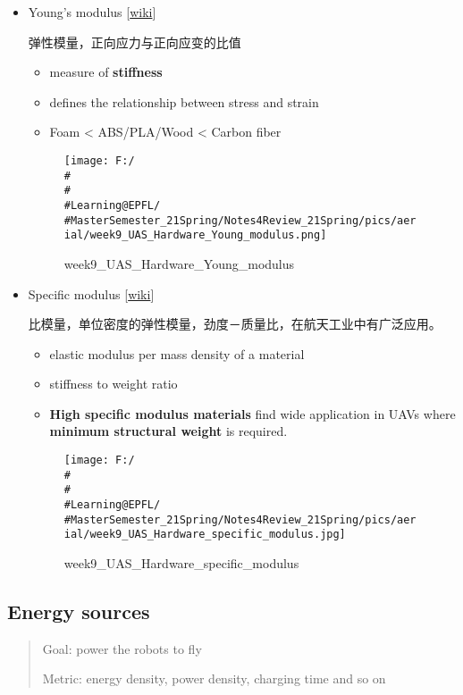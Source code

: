 \documentclass[]{article}
\begin{document}
\begin{itemize}
\item
  Young's modulus
  {[}\href{https://en.wikipedia.org/wiki/Young\%27s_modulus}{wiki}{]}

  弹性模量，正向应力与正向应变的比值

  \begin{itemize}
  \item
    measure of \textbf{stiffness}
  \item
    defines the relationship between stress and strain
  \item
    Foam \textless{} ABS/PLA/Wood \textless{} Carbon fiber
  \end{itemize}

  \begin{figure}
  \centering
  \texttt{[image: F:/\\\#\\\#\\\#Learning@EPFL/\\\#MasterSemester\_21Spring/Notes4Review\_21Spring/pics/aerial/week9\_UAS\_Hardware\_Young\_modulus.png]}
  \caption{week9\_UAS\_Hardware\_Young\_modulus}
  \end{figure}
\item
  Specific modulus
  {[}\href{https://en.wikipedia.org/wiki/Specific_modulus}{wiki}{]}

  比模量，单位密度的弹性模量，劲度－质量比，在航天工业中有广泛应用。

  \begin{itemize}
  \item
    elastic modulus per mass density of a material
  \item
    stiffness to weight ratio
  \item
    \textbf{High specific modulus materials} find wide application in
    UAVs where \textbf{minimum structural weight} is required.
  \end{itemize}

  \begin{figure}
  \centering
  \texttt{[image: F:/\\\#\\\#\\\#Learning@EPFL/\\\#MasterSemester\_21Spring/Notes4Review\_21Spring/pics/aerial/week9\_UAS\_Hardware\_specific\_modulus.jpg]}
  \caption{week9\_UAS\_Hardware\_specific\_modulus}
  \end{figure}
\end{itemize}

\subsection{Energy sources}\label{header-n1914}

\begin{quote}
Goal: power the robots to fly

Metric: energy density, power density, charging time and so on
\end{quote}
\end{document}
